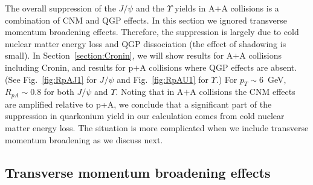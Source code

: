 \documentclass[article,showpacs,preprintnumbers,amsmath,amssymb]{revtex4}
\begin{document}
The overall suppression of the $J/\psi$ and the $\Upsilon$ yields in A$+$A
collisions is a combination of CNM and QGP effects. In this section we ignored
transverse momentum broadening effects. Therefore, the suppression is largely due to
cold nuclear matter energy loss and QGP dissociation (the effect of shadowing
is small). In Section~\ref{section:Cronin}, we will show results for A$+$A
collisions including Cronin, and results for p$+$A collisions where QGP effects
are absent. (See Fig.~\ref{fig:RpAJ1} for $J/\psi$ and Fig.~\ref{fig:RpAU1} for
$\Upsilon$.) For $p_T\sim 6$~GeV, $R_{pA}\sim0.8$ for both $J/\psi$ and
$\Upsilon$. Noting that in A$+$A collisions the CNM effects are amplified
relative to p+A, we conclude that a significant part of the suppression in
quarkonium yield in our calculation comes from cold nuclear matter energy loss.
The situation is more complicated when we include transverse momentum
broadening as we discuss next.



\subsection{Transverse momentum broadening effects~\label{section:Cronin}}
\end{document}

